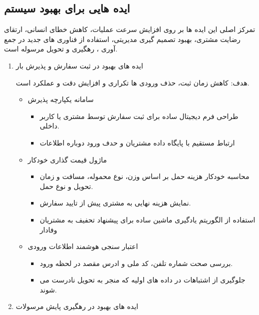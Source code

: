 \documentclass[12pt,a4paper]{report}
\begin{document}
\subsection{ایده هایی برای بهبود سیستم}
تمرکز اصلی این ایده ها بر روی افزایش سرعت عملیات، کاهش خطای انسانی، ارتقای رضایت مشتری، بهبود تصمیم گیری مدیریتی، استفاده از فناوری های جدید در جمع آوری ، رهگیری و تحویل مرسوله است.
\begin{enumerate}
	\item ایده های بهبود در ثبت سفارش و پذیرش بار
	
هدف: کاهش زمان ثبت، حذف ورودی ها تکراری و افزایش دقت و عملکرد است.
	\begin{itemize}
		\item سامانه یکپارچه پذیرش
		\begin{itemize}
			\item 
طراحی فرم دیجیتال ساده برای ثبت سفارش توسط مشتری یا کاربر داخلی.
			\item 
ارتباط مستقیم با پایگاه داده مشتریان و حدف ورود دوباره اطلاعات
		\end{itemize}
				\item ماژول قیمت گذاری خودکار
		\begin{itemize}
			\item 
محاسبه خودکار هزینه حمل بر اساس وزن، نوع محموله، مسافت و زمان تحویل و نوع حمل.
			\item نمایش هزینه نهایی به مشتری پیش از تایید سفارش.
			\item  استفاده از الگوریتم یادگیری ماشین ساده برای پیشنهاد تحفیف به مشتریان وفادار
		\end{itemize}
						\item اعتبار سنجی هوشمند اطلاعات ورودی
		\begin{itemize}
			\item 
بررسی صحت شماره تلفن، کد ملی و ادرس مقصد در لحظه ورود.
			\item 
جلوگیری از اشتباهات در داده های اولیه که منجر به تحویل نادرست می شوند.
		\end{itemize}
	\end{itemize}
	\item ایده های بهبود در رهگیری پایش مرسولات


\end{enumerate}
\end{document}
